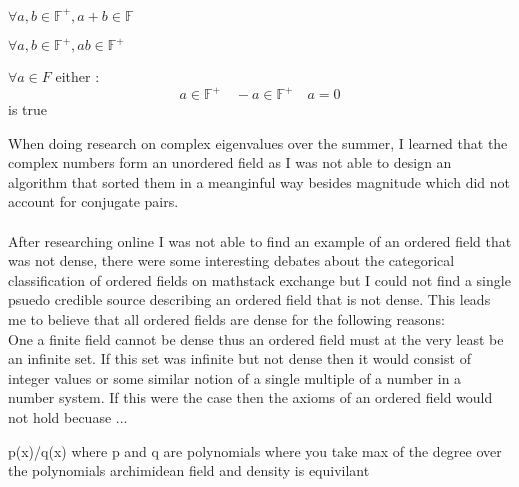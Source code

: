 \documentclass[11pt]{article}
\theoremstyle{definition}  %
\begin{document}
\begin{enumerate }
  \item $\forall a, b \in \mathbb{F}^+ , a+b \in \mathbb{F}$
  \item $\forall a,b \in \mathbb{F}^+, ab\in \mathbb{F}^+$
  \item $\forall a \in F$ either :
  \[
    a\in \mathbb{F}^+ \quad -a \in \mathbb{F}^+ \quad a=0
  \]
  is true
\end{enumerate }
When doing research on complex eigenvalues over the summer, I learned that the complex numbers form an unordered field as I was not able to design an algorithm that sorted them in a meanginful way besides magnitude which did not account for conjugate pairs. \\\\
After researching online I was not able to find an example of an ordered field that was not dense, there were some interesting debates about the categorical classification of ordered fields on mathstack exchange but I could not find a single psuedo credible source describing an ordered field that is not dense. This leads me to believe that all ordered fields are dense for the following reasons: \\
One a finite field cannot be dense thus an ordered field must at the very least be an infinite set. If this set was infinite but not dense then it would consist of integer values or some similar notion of a single multiple of a number in a number system. If this were the case then the axioms of an ordered field would not hold becuase ...


p(x)/q(x) where p and q are polynomials where you take max of the degree over the polynomials archimidean field and density is equivilant
\end{document}
